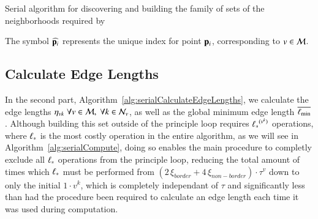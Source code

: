 \begin{algorithm}
	\DontPrintSemicolon


	\bigskip
	\;
\nl	{}
	\caption{Serial algorithm for discovering and building the family of sets of the neighborhoods required by  \label{alg:serialBuildNeighborhoods}}
\end{algorithm}%

The symbol $\widehat{\mathbf{p}_i}$ represents the unique index for point $\mathbf{p}_i$, corresponding to $v \in \mathcal{M}$.

%
%
%
\subsection{Calculate Edge Lengths}
\label{ch5sSIssCEL}
In the second part, Algorithm~\ref{alg:serialCalculateEdgeLengths}, we calculate the edge lengths $\eta_{vk} \; \forall v \in \mathcal{M}, \; \forall  k \in \mathcal{N}_v$, as well as the global minimum edge length $\overline{\ell_\text{min}}$. Although building this set outside of the principle loop requires ${\ell_\ast}^{(v^k)}$ operations, where $\ell_\ast$ is the most costly operation in the entire algorithm, as we will see in Algorithm~\ref{alg:serialCompute}, doing so enables the main procedure to completly exclude all $\ell_\ast$ operations from the principle loop, reducing the total amount of times which $\ell_\ast$ must be performed from ${(2\,\xi_{border} + 4\,\xi_{non-border})\cdot\tau^v}$ down to only the initial $1\cdot v^k$, which is completely independant of $\tau$ and significantly less than had the procedure been required to calculate an edge length each time it was used during computation.%
%

